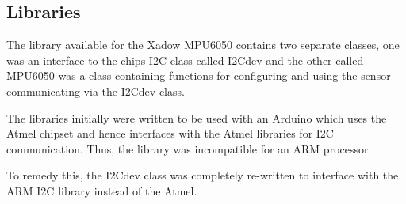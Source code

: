 
\subsection{Libraries}


The library available for the Xadow MPU6050 contains two separate classes, one was an interface to the chips I2C class called I2Cdev and the other called MPU6050 was a class containing functions for configuring and using the sensor communicating via the I2Cdev class. 

The libraries initially were written to be used with an Arduino which uses the Atmel chipset and hence interfaces with the Atmel libraries for I2C communication. Thus, the library was incompatible for an ARM processor. 

To remedy this, the I2Cdev class was completely re-written to interface with the ARM I2C library instead of the Atmel. 

